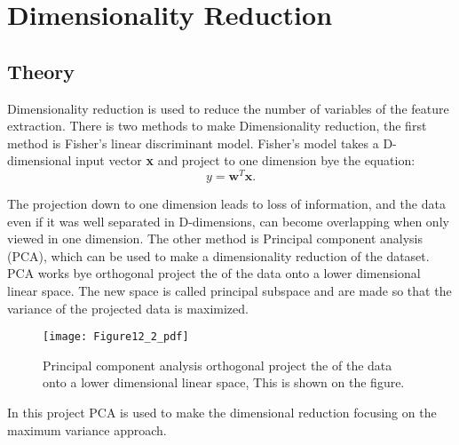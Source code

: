 \chapter{Dimensionality Reduction}
\section{Theory}
Dimensionality reduction is used to reduce the number of variables of the feature extraction.
There is two methods to make Dimensionality reduction, the first method is Fisher's linear discriminant model.
Fisher's model takes a D-dimensional input vector \textbf{x} and project to one dimension bye the equation:
\begin{equation}
y = \mathbf{w}^T \mathbf{x}.
\label{eq:fisher}
\end{equation} 

The projection down to one dimension leads to loss of information, and the data even if it was well separated in D-dimensions, can become overlapping when only viewed in one dimension.
The other method is Principal component analysis (PCA), which can be used to make a dimensionality reduction of the dataset.
PCA works bye orthogonal project the of the data onto a lower dimensional linear space.
The new space is called principal subspace and are made so that the variance of the projected data is maximized. 

\begin{figure}[H]
\centering
\texttt{[image: Figure12\_2\_pdf]}
\caption{Principal component analysis orthogonal project the of the data onto a lower dimensional linear space, This is shown on the figure. }
\label{fig:dim_PCA_book}
\end{figure}

In this project PCA is used to make the dimensional reduction focusing on the maximum variance approach.

